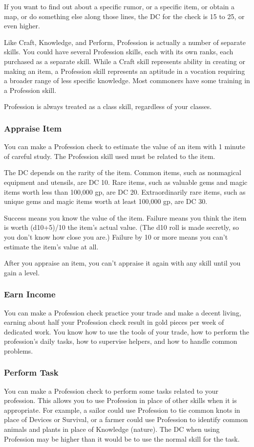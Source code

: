 If you want to find out about a specific rumor, or a specific item, or obtain a map, or do something else along those lines, the DC for the check is 15 to 25, or even higher.

Like Craft, Knowledge, and Perform, Profession is actually a number of separate skills. You could have several Profession skills, each with its own ranks, each purchased as a separate skill. While a Craft skill represents ability in creating or making an item, a Profession skill represents an aptitude in a vocation requiring a broader range of less specific knowledge. Most commoners have some training in a Profession skill. 

Profession is always treated as a class skill, regardless of your classes.

\subsubsection{Appraise Item}
You can make a Profession check to estimate the value of an item with 1 minute of careful study. The Profession skill used must be related to the item.

The DC depends on the rarity of the item. Common items, such as nonmagical equipment and utensils, are DC 10. Rare items, such as valuable gems and magic items worth less than 100,000 gp, are DC 20. Extraordinarily rare items, such as unique gems and magic items worth at least 100,000 gp, are DC 30.

Success means you know the value of the item. Failure means you think the item is worth (d10+5)/10 \mtimes the item's actual value. (The d10 roll is made secretly, so you don't know how close you are.) Failure by 10 or more means you can't estimate the item's value at all.

After you appraise an item, you can't appraise it again with any skill until you gain a level.

\subsubsection{Earn Income}
You can make a Profession check practice your trade and make a decent living, earning about half your Profession check result in gold pieces per week of dedicated work. You know how to use the tools of your trade, how to perform the profession's daily tasks, how to supervise helpers, and how to handle common problems.

\subsubsection{Perform Task}
You can make a Profession check to perform some tasks related to your profession. This allows you to use Profession in place of other skills when it is appropriate. For example, a sailor could use Profession to tie common knots in place of Devices or Survival, or a farmer could use Profession to identify common animals and plants in place of Knowledge (nature). The DC when using Profession may be higher than it would be to use the normal skill for the task.

